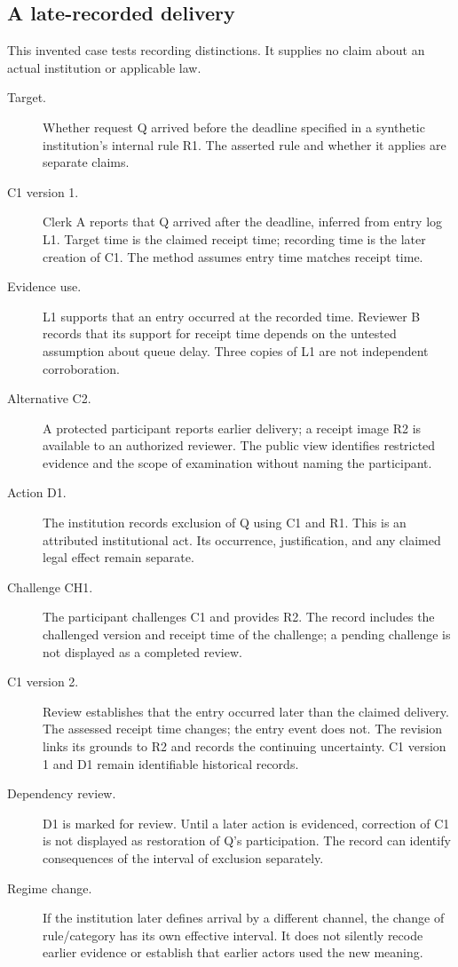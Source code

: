 \documentclass[11pt,a4paper]{article}
\begin{document}
\subsection{A late-recorded delivery}

This invented case tests recording distinctions. It supplies no claim about an actual institution or applicable law.

\begin{description}
\item[Target.] Whether request Q arrived before the deadline specified in a synthetic institution's internal rule R1. The asserted rule and whether it applies are separate claims.
\item[C1 version 1.] Clerk A reports that Q arrived after the deadline, inferred from entry log L1. Target time is the claimed receipt time; recording time is the later creation of C1. The method assumes entry time matches receipt time.
\item[Evidence use.] L1 supports that an entry occurred at the recorded time. Reviewer B records that its support for receipt time depends on the untested assumption about queue delay. Three copies of L1 are not independent corroboration.
\item[Alternative C2.] A protected participant reports earlier delivery; a receipt image R2 is available to an authorized reviewer. The public view identifies restricted evidence and the scope of examination without naming the participant.
\item[Action D1.] The institution records exclusion of Q using C1 and R1. This is an attributed institutional act. Its occurrence, justification, and any claimed legal effect remain separate.
\item[Challenge CH1.] The participant challenges C1 and provides R2. The record includes the challenged version and receipt time of the challenge; a pending challenge is not displayed as a completed review.
\item[C1 version 2.] Review establishes that the entry occurred later than the claimed delivery. The assessed receipt time changes; the entry event does not. The revision links its grounds to R2 and records the continuing uncertainty. C1 version 1 and D1 remain identifiable historical records.
\item[Dependency review.] D1 is marked for review. Until a later action is evidenced, correction of C1 is not displayed as restoration of Q's participation. The record can identify consequences of the interval of exclusion separately.
\item[Regime change.] If the institution later defines arrival by a different channel, the change of rule/category has its own effective interval. It does not silently recode earlier evidence or establish that earlier actors used the new meaning.
\end{description}
\end{document}
